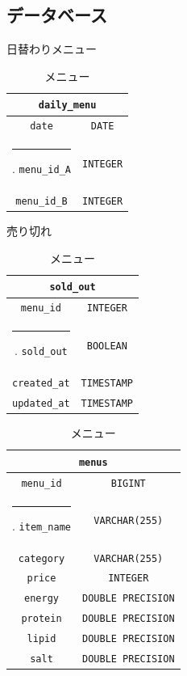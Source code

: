\documentclass[a4paper]{ltjsarticle}
\makeatletter
\def\Hline{
    \noalign{\ifnum0=`}\fi\hrule \@height 2.\arrayrulewidth \futurelet
    \reserved@a\@xhline}
\makeatother
\begin{document}
    \subsection{データベース}
        \begin{table}[h]
            \begin{minipage}[t]{.49\textwidth}
                \center
                \caption{日替わりメニュー}
                \label{daily-menu}
                \begin{tabular}{|c|c|}
                    \hline
                    \multicolumn{2}{|c|}{\texttt{daily\_menu}} \\ \hline \hline
                    \verb|date| & \verb|DATE| \\ \Hline
                    \verb|menu_id_A| & \verb|INTEGER| \\ \hline
                    \verb|menu_id_B| & \verb|INTEGER| \\ \hline
                \end{tabular}
                \center
                \caption{売り切れ}
                \label{soldout}
                \begin{tabular}{|c|c|}
                    \hline
                    \multicolumn{2}{|c|}{\texttt{sold\_out}} \\ \hline \hline
                    \verb|menu_id| & \verb|INTEGER| \\ \Hline
                    \verb|sold_out| & \verb|BOOLEAN| \\ \hline
                    \verb|created_at| & \verb|TIMESTAMP| \\ \hline
                    \verb|updated_at| & \verb|TIMESTAMP| \\ \hline
                \end{tabular}
            \end{minipage}
            \begin{minipage}[t]{.49\textwidth}
                \center
                \caption{メニュー}
                \label{menu}
                \begin{tabular}{|c|c|}
                    \hline
                    \multicolumn{2}{|c|}{\texttt{menus}} \\ \hline \hline
                    \verb|menu_id| & \verb|BIGINT| \\ \Hline
                    \verb|item_name| & \verb|VARCHAR(255)| \\ \hline
                    \verb|category| & \verb|VARCHAR(255)| \\ \hline
                    \verb|price| & \verb|INTEGER| \\ \hline
                    \verb|energy| & \verb|DOUBLE PRECISION| \\ \hline
                    \verb|protein| & \verb|DOUBLE PRECISION| \\ \hline
                    \verb|lipid| & \verb|DOUBLE PRECISION| \\ \hline
                    \verb|salt| & \verb|DOUBLE PRECISION| \\ \hline
                \end{tabular}
            \end{minipage}
        \end{table}
\end{document}
